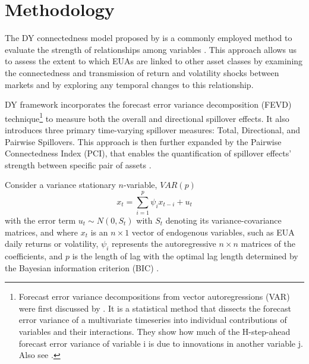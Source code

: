 \documentclass[preprint, 3p,
authoryear]{elsarticle} %
\begin{document}
\hypertarget{methodology}{%
\section{Methodology}\label{methodology}}

The DY connectedness model proposed by
\citet{diebold_measuring_2009, diebold_better_2012, diebold_network_2014}
is a commonly employed method to evaluate the strength of relationships
among variables
\citep{zhang_dynamic_2016, xia_asymmetric_2019, ji_information_2019, tan_how_2020, gabauer_dynamic_2021, hanif_nonlinear_2021, diebold_past_2023, dong_risk_2024, gong_physical_2024}.
This approach allows us to assess the extent to which EUAs are linked to
other asset classes by examining the connectedness and transmission of
return and volatility shocks between markets and by exploring any
temporal changes to this relationship.

DY framework incorporates the forecast error variance decomposition
(FEVD)
technique\footnote{Forecast error variance decompositions from vector autoregressions (VAR) were first discussed by \citep{sims_macroeconomics_1980}. It is a statistical method that dissects the forecast error variance of a multivariate timeseries into individual contributions of variables and their interactions. They show how much of the H-step-ahead forecast error variance of variable i is due to innovations in another variable j. Also see \citep{diebold_better_2012}.}
to measure both the overall and directional spillover effects. It also
introduces three primary time-varying spillover measures: Total,
Directional, and Pairwise Spillovers. This approach is then further
expanded by the Pairwise Connectedness Index (PCI), that enables the
quantification of spillover effects' strength between specific pair of
assets \citep{gabauer_dynamic_2021}.

Consider a variance stationary \(n\)-variable, \(VAR(p)\)
\begin{equation}
x_t = \sum_{i=1}^p\psi_ix_{t-i}+u_t
\end{equation} with the error term \(u_t \sim N(0,S_t)\) with \(S_t\)
denoting its variance-covariance matrices, and where \(x_t\) is an
\(n \times 1\) vector of endogenous variables, such as EUA daily returns
or volatility, \(\psi_i\) represents the autoregressive \(n \times n\)
matrices of the coefficients, and \(p\) is the length of lag with the
optimal lag length determined by the Bayesian information criterion
(BIC) \citep{diebold_better_2012, pham_impact_2023}.
\end{document}
